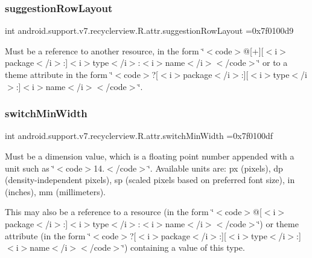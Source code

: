 \subsubsection{\texorpdfstring{suggestion\+Row\+Layout}{suggestionRowLayout}}
{\footnotesize\ttfamily int android.\+support.\+v7.\+recyclerview.\+R.\+attr.\+suggestion\+Row\+Layout =0x7f0100d9\hspace{0.3cm}{\ttfamily [static]}}

Must be a reference to another resource, in the form \char`\"{}$<$code$>$@\mbox{[}+\mbox{]}\mbox{[}$<$i$>$package$<$/i$>$\+:\mbox{]}$<$i$>$type$<$/i$>$\+:$<$i$>$name$<$/i$>$$<$/code$>$\char`\"{} or to a theme attribute in the form \char`\"{}$<$code$>$?\mbox{[}$<$i$>$package$<$/i$>$\+:\mbox{]}\mbox{[}$<$i$>$type$<$/i$>$\+:\mbox{]}$<$i$>$name$<$/i$>$$<$/code$>$\char`\"{}. \mbox{\label{classandroid_1_1support_1_1v7_1_1recyclerview_1_1R_1_1attr_a871b4626c047732e630fa404ab707920}} 
\subsubsection{\texorpdfstring{switch\+Min\+Width}{switchMinWidth}}
{\footnotesize\ttfamily int android.\+support.\+v7.\+recyclerview.\+R.\+attr.\+switch\+Min\+Width =0x7f0100df\hspace{0.3cm}{\ttfamily [static]}}

Must be a dimension value, which is a floating point number appended with a unit such as \char`\"{}$<$code$>$14.\+5sp$<$/code$>$\char`\"{}. Available units are\+: px (pixels), dp (density-\/independent pixels), sp (scaled pixels based on preferred font size), in (inches), mm (millimeters). 

This may also be a reference to a resource (in the form \char`\"{}$<$code$>$@\mbox{[}$<$i$>$package$<$/i$>$\+:\mbox{]}$<$i$>$type$<$/i$>$\+:$<$i$>$name$<$/i$>$$<$/code$>$\char`\"{}) or theme attribute (in the form \char`\"{}$<$code$>$?\mbox{[}$<$i$>$package$<$/i$>$\+:\mbox{]}\mbox{[}$<$i$>$type$<$/i$>$\+:\mbox{]}$<$i$>$name$<$/i$>$$<$/code$>$\char`\"{}) containing a value of this type. \mbox{\label{classandroid_1_1support_1_1v7_1_1recyclerview_1_1R_1_1attr_acd77a0561bd90ce02c6465d57490ff3a}} 
